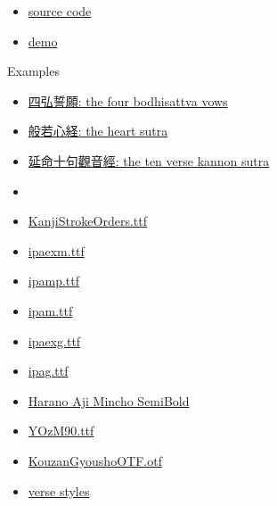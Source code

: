 \documentclass[letterpaper]{article}
\begin{document}
	\vspace*{1cm}
 
	\begin{itemize}
		
			\item[] {\Large 
			 \href{https://github.com/gwmatthews/TheFourVows}{source code}}
			 \item[] {\Large 
			 	\href{https://gwmatthews.github.io/the-four-vows.pdf}{demo}}
		
	\end{itemize}
	
	
	\vfill\eject\pagebreak
	
	\vspace*{2cm}
	
	{\LARGE Examples}
	
	\vspace*{1cm}
	
	\begin{itemize}
		\item[] \href{https://gwmatthews.github.io/the-four-vows.pdf}{四弘誓願: the four bodhisattva vows}
		\item[] \href{https://gwmatthews.github.io/the-heart-sutra.pdf}{般若心経: the heart sutra}
		\item[] \href{https://gwmatthews.github.io/kanzeon.pdf}{延命十句觀音經: the ten verse kannon sutra}
		\item[] 
		\item[] \href{https://gwmatthews.github.io/examples/stroke-order.pdf}{KanjiStrokeOrders.ttf}
		\item[] \href{https://gwmatthews.github.io/examples/ipaexm.pdf}{ipaexm.ttf}
		\item[] \href{https://gwmatthews.github.io/examples/ipamp.pdf}{ipamp.ttf}
		\item[] 
			\href{https://gwmatthews.github.io/examples/ipam.pdf}{ipam.ttf}
		\item[] \href{https://gwmatthews.github.io/examples/ipaexg.pdf}{ipaexg.ttf}
		\item[] 
			\href{https://gwmatthews.github.io/examples/ipag.pdf}{ipag.ttf}
		\item[] \href{https://gwmatthews.github.io/examples/HaranoAjiMinchoSB.pdf}{Harano Aji Mincho SemiBold}
		\item[] \href{https://gwmatthews.github.io/examples/YOzM90.pdf}{YOzM90.ttf}
		\item[] \href{https://gwmatthews.github.io/examples/KouzanGyousho.pdf}{KouzanGyoushoOTF.otf}
		\item[] \href{https://gwmatthews.github.io/examples/verse-test.pdf}{verse styles}
		
	\end{itemize}
\end{document}
